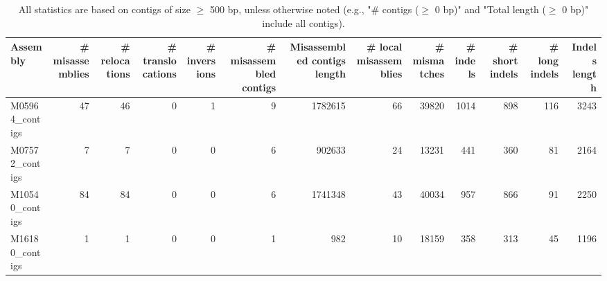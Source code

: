 \documentclass[12pt,a4paper]{article}
\begin{document}
\begin{table}[ht]
\begin{center}
\caption{All statistics are based on contigs of size $\geq$ 500 bp, unless otherwise noted (e.g., "\# contigs ($\geq$ 0 bp)" and "Total length ($\geq$ 0 bp)" include all contigs).}
\begin{tabular}{|l*{12}{|r}|}
\hline
Assembly & \# misassemblies &     \# relocations &     \# translocations &     \# inversions & \# misassembled contigs & Misassembled contigs length & \# local misassemblies & \# mismatches & \# indels &     \# short indels &     \# long indels & Indels length \\ \hline
M05964\_contigs & 47 & 46 & 0 & 1 & 9 & 1782615 & 66 & 39820 & 1014 & 898 & 116 & 3243 \\ \hline
M07572\_contigs & 7 & 7 & 0 & 0 & 6 & 902633 & 24 & 13231 & 441 & 360 & 81 & 2164 \\ \hline
M10540\_contigs & 84 & 84 & 0 & 0 & 6 & 1741348 & 43 & 40034 & 957 & 866 & 91 & 2250 \\ \hline
M16180\_contigs & 1 & 1 & 0 & 0 & 1 & 982 & 10 & 18159 & 358 & 313 & 45 & 1196 \\ \hline
\end{tabular}
\end{center}
\end{table}
\end{document}
